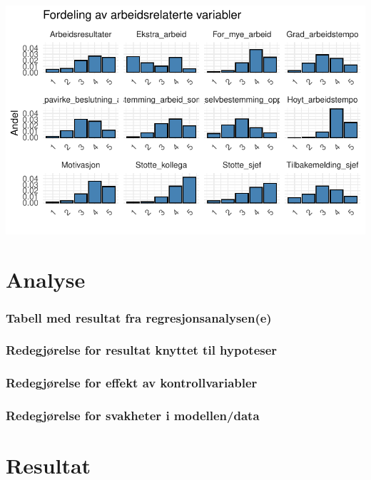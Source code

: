 \documentclass[
  12pt,
  a4paper,
  DIV=11,
  numbers=noendperiod]{scrartcl}
\begin{document}
\includegraphics{BACHELOR-SKRIVING-DANIEL-V2_files/figure-pdf/unnamed-chunk-19-1.pdf}

\newpage

\section{Analyse}\label{analyse}

\subsubsection{Tabell med resultat fra
regresjonsanalysen(e)}\label{tabell-med-resultat-fra-regresjonsanalysene}

\subsubsection{Redegjørelse for resultat knyttet til
hypoteser}\label{redegjuxf8relse-for-resultat-knyttet-til-hypoteser}

\subsubsection{Redegjørelse for effekt av
kontrollvariabler}\label{redegjuxf8relse-for-effekt-av-kontrollvariabler}

\subsubsection{Redegjørelse for svakheter i
modellen/data}\label{redegjuxf8relse-for-svakheter-i-modellendata}

\newpage

\section{Resultat}\label{resultat}
\end{document}
